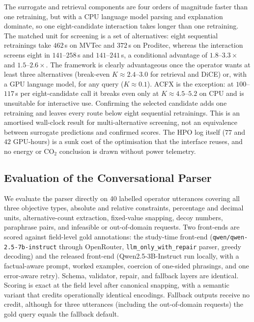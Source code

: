\documentclass[final,5p,times,twocolumn]{elsarticle}
\begin{document}
The surrogate and retrieval components are four orders of magnitude
faster than one retraining, but with a CPU language model parsing and
explanation dominate, so one eight-candidate interaction takes longer
than one retraining. The matched unit for screening is a set of
alternatives: eight sequential retrainings take $462$\,s on MVTec and
$372$\,s on Proditec, whereas the interaction screens eight in
$141$--$258$\,s and $141$--$241$\,s, a conditional advantage of
$1.8$--$3.3\times$ and $1.5$--$2.6\times$. The framework is clearly
advantageous once the operator wants at least three alternatives
(break-even $K \approx 2.4$--$3.0$ for retrieval and DiCE) or, with a
GPU language model, for any query ($K \approx 0.1$). ACFX is the exception: at $100$--$117$\,s per eight-candidate call it breaks even only at
$K \approx 4.5$--$5.2$ on CPU and is unsuitable for interactive use.
Confirming the selected candidate adds one retraining and leaves every
route below eight sequential retrainings. This is an amortised
wall-clock result for multi-alternative screening, not an equivalence
between surrogate predictions and confirmed scores. The HPO log itself
($77$ and $42$ GPU-hours) is a sunk cost of the optimisation that the
interface reuses, and no energy or CO$_2$ conclusion is drawn without
power telemetry.

\subsection{Evaluation of the Conversational Parser}
\label{subsec:parser-eval}

We evaluate the parser directly on 40 labelled operator utterances
covering all three objective types, absolute and relative constraints,
percentage and decimal units, alternative-count extraction, fixed-value
snapping, decoy numbers, paraphrase pairs, and infeasible or
out-of-domain requests. Two front-ends are scored against field-level
gold annotations: the study-time front-end
(\texttt{qwen/qwen-2.5-7b-instruct} through OpenRouter,
\texttt{llm\_only\_with\_repair} parser, greedy decoding) and the
released front-end (Qwen2.5-3B-Instruct run locally, with a
factual-aware prompt, worked examples, coercion of one-sided phrasings,
and one error-aware retry). Schema, validator, repair, and fallback layers are identical. Scoring is exact at the field level after
canonical snapping, with a semantic variant that credits operationally identical encodings. Fallback outputs receive no credit, although for
three utterances (including the out-of-domain requests) the gold query
equals the fallback default.
\end{document}
